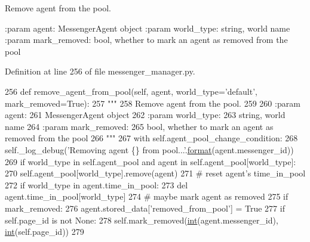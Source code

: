 \begin{DoxyVerb}Remove agent from the pool.

:param agent:
    MessengerAgent object
:param world_type:
    string, world name
:param mark_removed:
    bool, whether to mark an agent as removed from the pool
\end{DoxyVerb}
 

Definition at line 256 of file messenger\+\_\+manager.\+py.


\begin{DoxyCode}
256     \textcolor{keyword}{def }remove\_agent\_from\_pool(self, agent, world\_type='default', mark\_removed=True):
257         \textcolor{stringliteral}{"""}
258 \textcolor{stringliteral}{        Remove agent from the pool.}
259 \textcolor{stringliteral}{}
260 \textcolor{stringliteral}{        :param agent:}
261 \textcolor{stringliteral}{            MessengerAgent object}
262 \textcolor{stringliteral}{        :param world\_type:}
263 \textcolor{stringliteral}{            string, world name}
264 \textcolor{stringliteral}{        :param mark\_removed:}
265 \textcolor{stringliteral}{            bool, whether to mark an agent as removed from the pool}
266 \textcolor{stringliteral}{        """}
267         with self.agent\_pool\_change\_condition:
268             self.\_log\_debug(\textcolor{stringliteral}{'Removing agent \{\} from pool...'}.\hyperlink{namespaceparlai_1_1chat__service_1_1services_1_1messenger_1_1shared__utils_a32e2e2022b824fbaf80c747160b52a76}{format}(agent.messenger\_id))
269             \textcolor{keywordflow}{if} world\_type \textcolor{keywordflow}{in} self.agent\_pool \textcolor{keywordflow}{and} agent \textcolor{keywordflow}{in} self.agent\_pool[world\_type]:
270                 self.agent\_pool[world\_type].remove(agent)
271                 \textcolor{comment}{# reset agent's time\_in\_pool}
272                 \textcolor{keywordflow}{if} world\_type \textcolor{keywordflow}{in} agent.time\_in\_pool:
273                     del agent.time\_in\_pool[world\_type]
274                 \textcolor{comment}{# maybe mark agent as removed}
275                 \textcolor{keywordflow}{if} mark\_removed:
276                     agent.stored\_data[\textcolor{stringliteral}{'removed\_from\_pool'}] = \textcolor{keyword}{True}
277                     \textcolor{keywordflow}{if} self.page\_id \textcolor{keywordflow}{is} \textcolor{keywordflow}{not} \textcolor{keywordtype}{None}:
278                         self.mark\_removed(\hyperlink{namespacelanguage__model_1_1eval__ppl_a7d12ee00479673c5c8d1f6d01faa272a}{int}(agent.messenger\_id), \hyperlink{namespacelanguage__model_1_1eval__ppl_a7d12ee00479673c5c8d1f6d01faa272a}{int}(self.page\_id))
279 
\end{DoxyCode}

